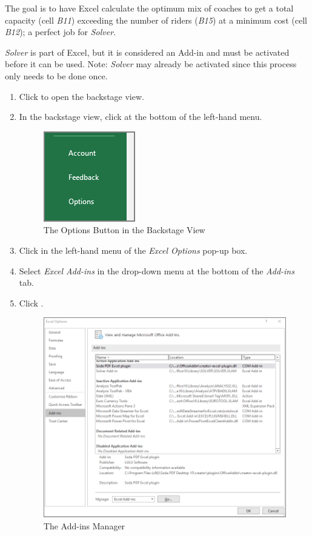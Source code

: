 The goal is to have Excel calculate the optimum mix of coaches to get a total capacity (cell \textit{B11}) exceeding the number of riders (\textit{B15}) at a minimum cost (cell \textit{B12}); a perfect job for \textit{Solver}.

\textit{Solver} is part of Excel, but it is considered an Add-in and must be activated before it can be used. Note: \textit{Solver} may already be activated since this process only needs to be done once.

\begin{enumbox}
	\begin{enumerate}
		\item Click  to open the backstage view.
		\item In the backstage view, click  at the bottom of the left-hand menu.	
	
		\begin{figure}[H]
			\centering
			\includegraphics[width=\maxwidth{.40\linewidth}]{gfx/ch08_fig70}
			\caption{The Options Button in the Backstage View}
			\label{08:fig70}
		\end{figure}
	
		\item Click  in the left-hand menu of the \textit{Excel Options} pop-up box.
		\item Select \textit{Excel Add-ins} in the drop-down menu at the bottom of the \textit{Add-ins} tab.
		\item Click .
	
		\begin{figure}[H]
			\centering
			\includegraphics[width=\maxwidth{.95\linewidth}]{gfx/ch08_fig71}
			\caption{The Add-ins Manager}
			\label{08:fig71}
		\end{figure}
	

\end{enumerate}
\end{enumbox}
